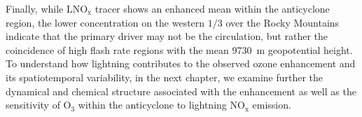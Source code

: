 Finally, while $\mathrm{LNO_x}$ tracer shows an enhanced mean within the anticyclone region,
the lower concentration on the western $1/3$ over the Rocky Mountains indicate that
the primary driver may not be the circulation, but rather the coincidence of high flash rate
regions with the mean 9730~m geopotential height. To understand how lightning
contributes to the observed ozone enhancement and its spatiotemporal variability,
in the next chapter, we examine further the dynamical and chemical
structure associated with the enhancement as well as the sensitivity of O$_3$ within the anticyclone
to lightning NO$_{\mathrm{x}}$ emission.
